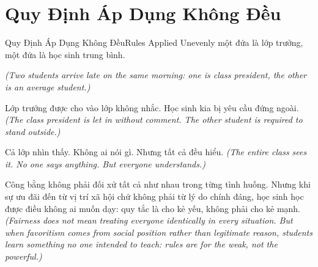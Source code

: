 \section{Quy Định Áp Dụng Không Đều}
\begin{truyen}{Quy Định Áp Dụng Không Đều}{Rules Applied Unevenly}
 một đứa là lớp trưởng, một đứa là học sinh trung bình.

\textit{(Two students arrive late on the same morning: one is class president, the other is an average student.)}

Lớp trưởng được cho vào lớp không nhắc. Học sinh kia bị yêu cầu đứng ngoài.
\textit{(The class president is let in without comment. The other student is required to stand outside.)}

Cả lớp nhìn thấy. Không ai nói gì. Nhưng tất cả đều hiểu.
\textit{(The entire class sees it. No one says anything. But everyone understands.)}

\begin{baihoc}
Công bằng không phải đối xử tất cả như nhau trong từng tình huống. Nhưng khi sự ưu đãi đến từ vị trí xã hội chứ không phải từ lý do chính đáng, học sinh học được điều không ai muốn dạy: quy tắc là cho kẻ yếu, không phải cho kẻ mạnh.
\textit{(Fairness does not mean treating everyone identically in every situation. But when favoritism comes from social position rather than legitimate reason, students learn something no one intended to teach: rules are for the weak, not the powerful.)}
\end{baihoc}
\end{truyen}

